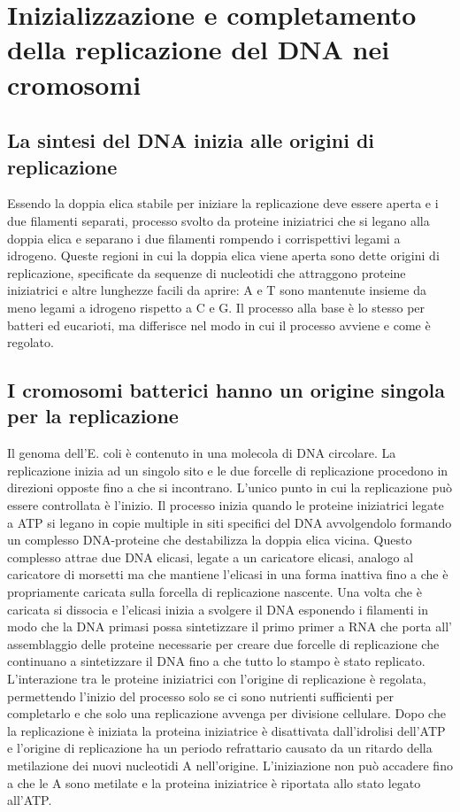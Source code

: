 \section{Inizializzazione e completamento della replicazione del DNA nei cromosomi}
\subsection{La sintesi del DNA inizia alle origini di replicazione}
Essendo la doppia elica stabile per iniziare la replicazione deve essere aperta e i due filamenti separati, processo svolto da proteine iniziatrici che si legano alla doppia elica e 
separano i due filamenti rompendo i corrispettivi legami a idrogeno. Queste regioni in cui la doppia elica viene aperta sono dette origini di replicazione, specificate da sequenze di 
nucleotidi che attraggono proteine iniziatrici e altre lunghezze facili da aprire: A e T sono mantenute insieme da meno legami a idrogeno rispetto a C e G. Il processo alla base \`e lo
stesso per batteri ed eucarioti, ma differisce nel modo in cui il processo avviene e come \`e regolato. 
\subsection{I cromosomi batterici hanno un origine singola per la replicazione}
Il genoma dell'E. coli \`e contenuto in una molecola di DNA circolare. La replicazione inizia ad un singolo sito e le due forcelle di replicazione procedono in direzioni opposte fino
a che si incontrano. L'unico punto in cui la replicazione pu\`o essere controllata \`e l'inizio. Il processo inizia quando le proteine iniziatrici legate a ATP si legano in copie 
multiple in siti specifici del DNA avvolgendolo formando un complesso DNA-proteine che destabilizza la doppia elica vicina. Questo complesso attrae due DNA elicasi, legate a un 
caricatore elicasi, analogo al caricatore di morsetti ma che mantiene l'elicasi in una forma inattiva fino a che \`e propriamente caricata sulla forcella di replicazione nascente. Una
volta che \`e caricata si dissocia e l'elicasi inizia a svolgere il DNA esponendo i filamenti in modo che la DNA primasi possa sintetizzare il primo primer a RNA che porta all'
assemblaggio delle proteine necessarie per creare due forcelle di replicazione che continuano a sintetizzare il DNA fino a che tutto lo stampo \`e stato replicato. L'interazione tra le
proteine iniziatrici con l'origine di replicazione \`e regolata, permettendo l'inizio del processo solo se ci sono nutrienti sufficienti per completarlo e che solo una replicazione 
avvenga per divisione cellulare. Dopo che la replicazione \`e iniziata la proteina iniziatrice \`e disattivata dall'idrolisi dell'ATP e l'origine di replicazione ha un periodo 
refrattario causato da un ritardo della metilazione dei nuovi nucleotidi A nell'origine. L'iniziazione non pu\`o accadere fino a che le A sono metilate e la proteina iniziatrice \`e 
riportata allo stato legato all'ATP. 
